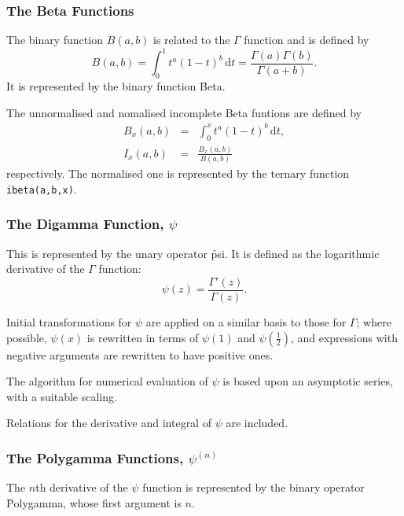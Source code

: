 \subsubsection{The Beta Functions}
\hypertarget{BETAF}{}
\hypertarget{operator:BETA}{}
\hypertarget{operator:IBETA}{}
The binary function $B(a,b)$ is related to the $\Gamma$
function\cite{AbramowitzStegun:72} and is defined by
\[ B(a,b) = \int_0^1 t^a (1-t)^b\, \mathrm{d}t =
\frac{\Gamma(a)\Gamma(b)}{\Gamma(a+b)}.\]
It is represented by the binary function \f{Beta}.

The unnormalised and nomalised incomplete Beta funtions are defined by
\begin{eqnarray*}
B_x(a,b) & = & \int_0^x t^a (1-t)^b\, \mathrm{d}t,\\
I_x(a,b) & = & \frac{B_x(a,b)}{B(a,b)}
\end{eqnarray*}
respectively. The normalised one is represented by the ternary function
\texttt{ibeta(a,b,x)}.

\subsubsection{The Digamma Function, $\psi$}
\hypertarget{DIGAM}{}

This is represented by the unary operator \f{psi}. It is defined as the
logarithmic derivative of the $\Gamma$  function:
\[ \psi(z) = \frac{\Gamma'(z)}{\Gamma(z)}. \]

Initial transformations for $\psi$ are applied on a similar basis to
those for $\Gamma$; where possible, $\psi(x)$ is rewritten in
terms of $\psi(1)$ and $\psi(\frac{1}{2})$, and expressions with negative
arguments are rewritten to have positive ones.

The algorithm for numerical evaluation of $\psi$ is based upon an
asymptotic series, with a suitable scaling.

Relations for the derivative and integral of $\psi$ are included.

\subsubsection{The Polygamma Functions, $\psi^{(n)}$}
\hypertarget{POLYGAM}{}

The $n$th derivative of the $\psi$ function is represented by the
binary operator \f{Polygamma}, whose first argument is $n$.

